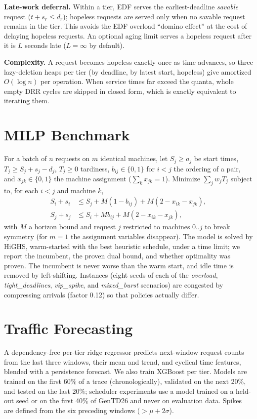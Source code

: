\documentclass[conference]{IEEEtran}
\begin{document}
\textbf{Late-work deferral.} Within a tier, EDF serves the earliest-deadline \emph{savable} request ($t+s_r\le d_r$); hopeless requests are served only when no savable request remains in the tier. This avoids the EDF overload ``domino effect'' at the cost of delaying hopeless requests. An optional aging limit serves a hopeless request after it is $L$ seconds late ($L=\infty$ by default).

\textbf{Complexity.} A request becomes hopeless exactly once as time advances, so three lazy-deletion heaps per tier (by deadline, by latest start, hopeless) give amortized $O(\log n)$ per operation. When service times far exceed the quanta, whole empty DRR cycles are skipped in closed form, which is exactly equivalent to iterating them.

\section{MILP Benchmark}
\label{sec:milp}

For a batch of $n$ requests on $m$ identical machines, let $S_j\ge a_j$ be start times, $T_j\ge S_j+s_j-d_j$, $T_j\ge 0$ tardiness, $b_{ij}\in\{0,1\}$ for $i<j$ the ordering of a pair, and $x_{jk}\in\{0,1\}$ the machine assignment ($\sum_kx_{jk}=1$). Minimize $\sum_jw_jT_j$ subject to, for each $i<j$ and machine $k$,
\begin{align}
S_i+s_i &\le S_j + M(1-b_{ij}) + M(2-x_{ik}-x_{jk}),\\
S_j+s_j &\le S_i + Mb_{ij} + M(2-x_{ik}-x_{jk}),
\end{align}
with $M$ a horizon bound and request $j$ restricted to machines $0..j$ to break symmetry (for $m=1$ the assignment variables disappear). The model is solved by HiGHS, warm-started with the best heuristic schedule, under a time limit; we report the incumbent, the proven dual bound, and whether optimality was proven. The incumbent is never worse than the warm start, and idle time is removed by left-shifting. Instances (eight seeds of each of the \emph{overload}, \emph{tight\_deadlines}, \emph{vip\_spike}, and \emph{mixed\_burst} scenarios) are congested by compressing arrivals (factor 0.12) so that policies actually differ.

\section{Traffic Forecasting}
\label{sec:forecast}

A dependency-free per-tier ridge regressor predicts next-window request counts from the last three windows, their mean and trend, and cyclical time features, blended with a persistence forecast. We also train XGBoost \cite{chen2016} per tier. Models are trained on the first 60\% of a trace (chronologically), validated on the next 20\%, and tested on the last 20\%; scheduler experiments use a model trained on a held-out seed or on the first 40\% of GenTD26 and never on evaluation data. Spikes are defined from the six preceding windows ($>\mu+2\sigma$).
\end{document}
